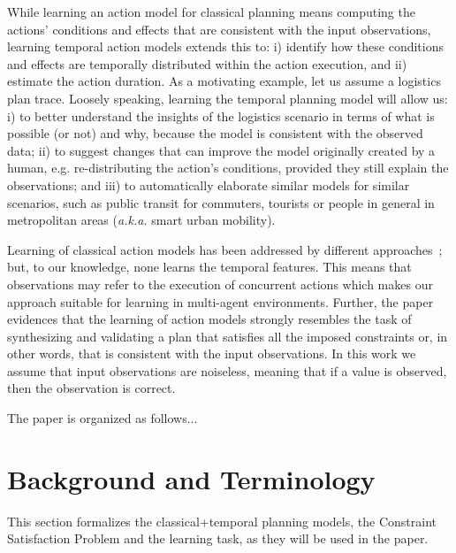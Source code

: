 \documentclass[runningheads]{llncs}
\begin{document}
While learning an action model for classical planning means computing the actions' conditions and effects that are consistent with the input observations, learning temporal action models extends this to: i) identify how these conditions and effects are temporally distributed within the action execution, and ii) estimate the action duration. As a motivating example, let us assume a logistics plan trace. Loosely speaking, learning the temporal planning model will allow us: i) to better understand the insights of the logistics scenario in terms of what is possible (or not) and why, because the model is consistent with the observed data; ii) to suggest changes that can improve the model originally created by a human, e.g. re-distributing the action's conditions, provided they still explain the observations; and iii) to automatically elaborate similar models for similar scenarios, such as public transit for commuters, tourists or people in general in metropolitan areas (\emph{a.k.a.} smart urban mobility).

Learning of classical action models has been addressed by different approaches~\cite{arora2018review}; but, to our knowledge, none learns the temporal features. This means that observations may refer to the execution of concurrent actions which makes our approach suitable for learning in multi-agent environments. Further, the paper evidences that the learning of action models strongly resembles the task of synthesizing and validating a plan that satisfies all the imposed constraints or, in other words, that is consistent with the input observations. In this work we assume that input observations are noiseless, meaning that if a value is observed, then the observation is correct.




The paper is organized as follows...


\section{Background and Terminology}
\label{sec:background}

This section formalizes the classical+temporal planning models, the Constraint Satisfaction Problem and the learning task, as they will be used in the paper.
\end{document}
